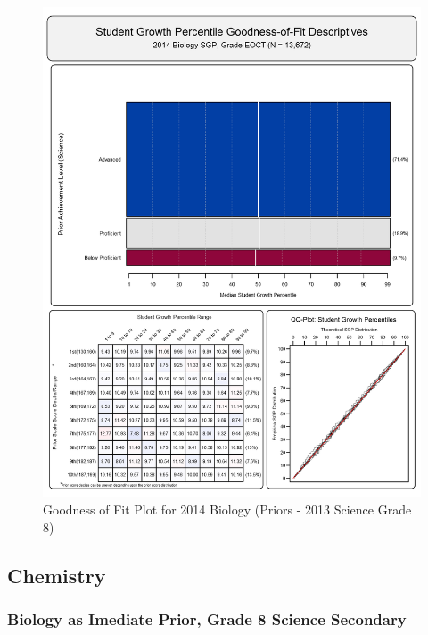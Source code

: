 \documentclass[12pt]{article}
\begin{document}
\begin{figure}[htbp]
\centering
\includegraphics{../img/Goodness_of_Fit/BIOLOGY.2014/2014_BIOLOGY_EOCT;2013_SCIENCE_8.png}
\caption{Goodness of Fit Plot for 2014 Biology (Priors - 2013 Science
Grade 8)}
\end{figure}

\clearpage 

\subsection{Chemistry}\label{chemistry}

\subsubsection{Biology as Imediate Prior, Grade 8 Science
Secondary}\label{biology-as-imediate-prior-grade-8-science-secondary}
\end{document}
